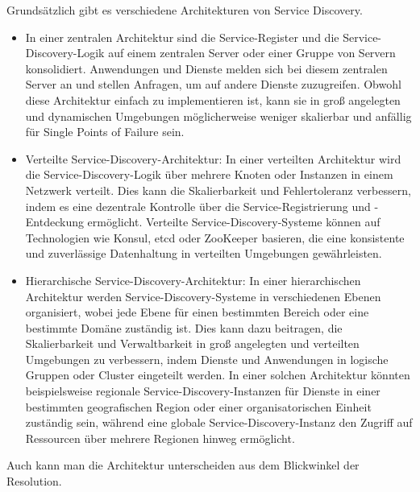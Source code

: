 \documentclass[../vs-script-first-v01.tex]{subfiles}
\begin{document}
Grundsätzlich gibt es verschiedene Architekturen von Service Discovery.
\begin{itemize}
\item In einer zentralen Architektur sind die Service-Register und die Service-Discovery-Logik auf einem zentralen Server oder einer Gruppe von Servern konsolidiert. Anwendungen und Dienste melden sich bei diesem zentralen Server an und stellen Anfragen, um auf andere Dienste zuzugreifen. Obwohl diese Architektur einfach zu implementieren ist, kann sie in groß angelegten und dynamischen Umgebungen möglicherweise weniger skalierbar und anfällig für Single Points of Failure sein.
\item Verteilte Service-Discovery-Architektur: In einer verteilten Architektur wird die Service-Discovery-Logik über mehrere Knoten oder Instanzen in einem Netzwerk verteilt. Dies kann die Skalierbarkeit und Fehlertoleranz verbessern, indem es eine dezentrale Kontrolle über die Service-Registrierung und -Entdeckung ermöglicht. Verteilte Service-Discovery-Systeme können auf Technologien wie Konsul, etcd oder ZooKeeper basieren, die eine konsistente und zuverlässige Datenhaltung in verteilten Umgebungen gewährleisten.

\item Hierarchische Service-Discovery-Architektur: In einer hierarchischen Architektur werden Service-Discovery-Systeme in verschiedenen Ebenen organisiert, wobei jede Ebene für einen bestimmten Bereich oder eine bestimmte Domäne zuständig ist. Dies kann dazu beitragen, die Skalierbarkeit und Verwaltbarkeit in groß angelegten und verteilten Umgebungen zu verbessern, indem Dienste und Anwendungen in logische Gruppen oder Cluster eingeteilt werden. In einer solchen Architektur könnten beispielsweise regionale Service-Discovery-Instanzen für Dienste in einer bestimmten geografischen Region oder einer organisatorischen Einheit zuständig sein, während eine globale Service-Discovery-Instanz den Zugriff auf Ressourcen über mehrere Regionen hinweg ermöglicht.
\end{itemize}

Auch kann man die Architektur unterscheiden aus dem Blickwinkel der Resolution. 
\end{document}
